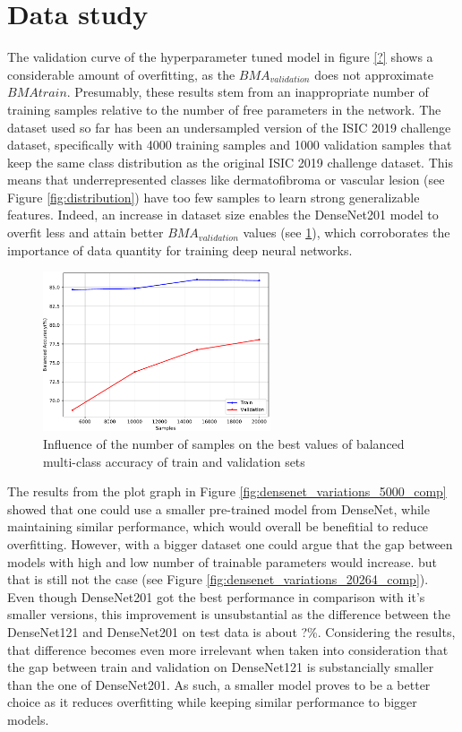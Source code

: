 \section{Data study} \label{section:balance}
    The validation curve of the hyperparameter tuned model in figure \ref{?} shows a considerable amount of overfitting, as the $BMA_{validation}$ does not approximate $BMA{train}$. Presumably, these results stem from an inappropriate number of training samples relative to the number of free parameters in the network. The dataset used so far has been an undersampled version of the ISIC 2019 challenge dataset, specifically with 4000 training samples and 1000 validation samples that keep the same class distribution as the original ISIC 2019 challenge dataset. This means that underrepresented classes like dermatofibroma or vascular lesion (see Figure  \ref{fig:distribution}) have too few samples to learn strong generalizable features. Indeed, an increase in dataset size enables the DenseNet201 model to overfit less and attain better $BMA_{validation}$ values (see \ref{fig:samples_comp}), which corroborates the importance of data quantity for training deep neural networks.   \par
    
    \begin{figure}[ht]
        \centering
        \includegraphics[width=0.6\textwidth]{figs/densenet201_samples_comp.pdf}
        \caption{Influence of the number of samples on the best values of balanced multi-class accuracy of train and validation sets}
        \label{fig:samples_comp}
    \end{figure}
    
    The results from the plot graph in Figure \ref{fig:densenet_variations_5000_comp} showed that one could use a  smaller pre-trained model from DenseNet, while maintaining similar performance, which would overall be benefitial to reduce overfitting. However, with a bigger dataset one could argue that the gap between models with high and low number of trainable parameters would increase. but that is still not the case (see Figure \ref{fig:densenet_variations_20264_comp}). Even though DenseNet201 got the best performance in comparison with it's smaller versions, this improvement is unsubstantial as the difference between the DenseNet121 and DenseNet201 on test data is about ?\%. Considering the results, that difference becomes even more irrelevant when taken into consideration that the gap between train and validation on DenseNet121 is substancially smaller than the one of DenseNet201. As such, a smaller model proves to be a better choice as it reduces overfitting while keeping similar performance to bigger models. \par
    
